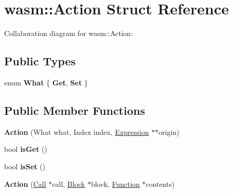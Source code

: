 \hypertarget{structwasm_1_1_action}{}\section{wasm\+:\+:Action Struct Reference}
\label{structwasm_1_1_action}


Collaboration diagram for wasm\+:\+:Action\+:
\subsection*{Public Types}
\begin{DoxyCompactItemize}
\item 
\mbox{\label{structwasm_1_1_action_a839c01a0e1de4f00a0fd6722fec20a33}} 
enum {\bfseries What} \{ {\bfseries Get}, 
{\bfseries Set}
 \}
\end{DoxyCompactItemize}
\subsection*{Public Member Functions}
\begin{DoxyCompactItemize}
\item 
\mbox{\label{structwasm_1_1_action_a849c1dee5fc8a9bf8932e0c750f076bf}} 
{\bfseries Action} (What what, Index index, \mbox{\hyperlink{classwasm_1_1_expression}{Expression}} $\ast$$\ast$origin)
\item 
\mbox{\label{structwasm_1_1_action_a31b6f56a8ee9c07d8878cd63e728fea4}} 
bool {\bfseries is\+Get} ()
\item 
\mbox{\label{structwasm_1_1_action_aa54afef875c3e5381b51af12c90d3320}} 
bool {\bfseries is\+Set} ()
\item 
\mbox{\label{structwasm_1_1_action_a64cc40936a2d116a48bd2d417cfc0c2f}} 
{\bfseries Action} (\mbox{\hyperlink{classwasm_1_1_call}{Call}} $\ast$call, \mbox{\hyperlink{classwasm_1_1_block}{Block}} $\ast$block, \mbox{\hyperlink{classwasm_1_1_function}{Function}} $\ast$contents)
\end{DoxyCompactItemize}
